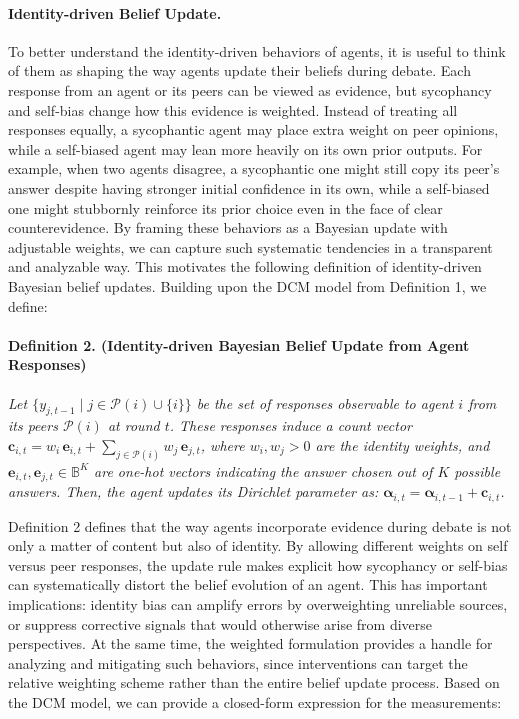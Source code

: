 \documentclass{article}
\begin{document}
\paragraph{Identity-driven Belief Update.}
To better understand the identity-driven behaviors of agents, it is useful to think of them as shaping the way agents update their beliefs during debate. 
Each response from an agent or its peers can be viewed as evidence, but sycophancy and self-bias change how this evidence is weighted. 
Instead of treating all responses equally, a sycophantic agent may place extra weight on peer opinions, while a self-biased agent may lean more heavily on its own prior outputs. 
For example, when two agents disagree, a sycophantic one might still copy its peer’s answer despite having stronger initial confidence in its own, while a self-biased one might stubbornly reinforce its prior choice even in the face of clear counterevidence. 
By framing these behaviors as a Bayesian update with adjustable weights, we can capture such systematic tendencies in a transparent and analyzable way. 
This motivates the following definition of identity-driven Bayesian belief updates.
Building upon the DCM model from Definition 1, we define:


\paragraph{Definition 2. (Identity-driven Bayesian Belief Update from Agent Responses)}
\textit{
Let \(\{y_{j,t-1} \mid j \in \mathcal{P}(i) \cup \{i\}\}\) be the set of responses observable to agent \( i \) from its peers $\mathcal{P}(i)$ at round \( t \). These responses induce a count vector \(\boldsymbol{c}_{i,t} = w_i \, \boldsymbol{e}_{i,t} + \sum_{j \in \mathcal{P}(i)} w_j \, \boldsymbol{e}_{j,t} \), where $w_i, w_{j} > 0$ are the identity weights, and  \(\boldsymbol{e}_{i,t}, \boldsymbol{e}_{j,t} \in \mathbb{B}^K\) are one-hot vectors indicating the answer chosen out of $K$ possible answers. Then, the agent updates its Dirichlet parameter as: 
\(
\boldsymbol{\alpha}_{i,t} = \boldsymbol{\alpha}_{i,t-1} + \boldsymbol{c}_{i,t}
\).
}
\vspace{2mm}

Definition 2 defines that the way agents incorporate evidence during debate is not only a matter of content but also of identity. 
By allowing different weights on self versus peer responses, the update rule makes explicit how sycophancy or self-bias can systematically distort the belief evolution of an agent. 
This has important implications: identity bias can amplify errors by overweighting unreliable sources, or suppress corrective signals that would otherwise arise from diverse perspectives.
At the same time, the weighted formulation provides a handle for analyzing and mitigating such behaviors, since interventions can target the relative weighting scheme rather than the entire belief update process. Based on the DCM model, we can provide a closed-form expression for the measurements:
\end{document}

